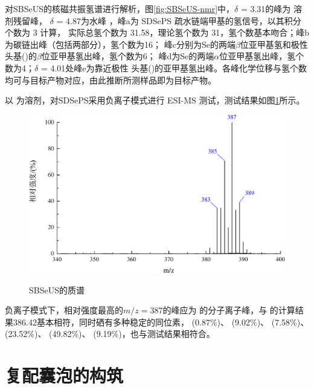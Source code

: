 \documentclass[bachelor,winfonts,replaceperiod]{jnuthesis}
\begin{document}
    对SBSeUS的核磁共振氢谱进行解析，图\ref{fig:SBSeUS-nmr}中，$\delta$ = 3.31的峰为 溶剂残留峰，
    $\delta$ = 4.87为水峰\cite{波谱解析} ，峰a为 SDSePS 疏水链端甲基的氢信号，以其积分个数为 3 计算，
    实际总氢个数为 31.58，理论氢个数为 31，氢个数基本吻合；峰b为碳链出峰（包括两部分），氢个数为16；
    峰c分别为Se的两端$\beta$位亚甲基氢和极性头基()的$\beta$位亚甲基氢出峰\cite{aist}，氢个数为6；
    峰d为Se的两端$\alpha$位亚甲基氢出峰\cite{徐辉碧1994,reich1978}，氢个数为4；$\delta$ = 4.01处峰e为靠近极性
    头基()的亚甲基氢出峰。各峰化学位移与氢个数均可与目标产物对应，由此推断所测样品即为目标产物。
    
    以 为溶剂，对SDSePS采用负离子模式进行 ESI-MS 测试，测试结果如图\ref{fig:SBSeUS-mass}所示。
    \begin{figure}[htbp]
        \centering
        \includegraphics[width=.7\textwidth]{figure/SBSeUS-mass.pdf}\\
        \caption{SBSeUS的质谱}\label{fig:SBSeUS-mass}
    \end{figure}
    
    负离子模式下，相对强度最高的$m/z = 387$的峰应为 的分子离子峰，与 
    的计算结果386.42基本相符，同时硒有多种稳定的同位素， (0.87\%)、 (9.02\%)、 (7.58\%)、
     (23.52\%)、 (49.82\%)、 (9.19\%)，也与测试结果相符合。

    \section{复配囊泡的构筑}
\end{document}
